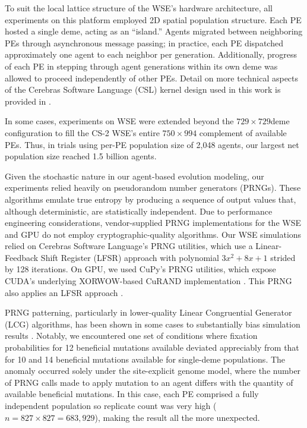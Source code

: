 To suit the local lattice structure of the WSE's hardware architecture, all experiments on this platform employed 2D spatial population structure.
Each PE hosted a single deme, acting as an ``island.''
Agents migrated between neighboring PEs through asynchronous message passing;
in practice, each PE dispatched approximately one agent to each neighbor per generation.
Additionally, progress of each PE in stepping through agent generations within its own deme was allowed to proceed independently of other PEs.
Detail on more technical aspects of the Cerebras Software Language (CSL) kernel design used in this work is provided in \citet{moreno2024trackable}.

In some cases, experiments on WSE were extended beyond the $729 \times 729$deme configuration to fill the CS-2 WSE's entire $750 \times 994$ complement of available PEs.
Thus, in trials using per-PE population size of 2,048 agents, our largest net population size reached 1.5 billion agents.

Given the stochastic nature in our agent-based evolution modeling, our experiments relied heavily on pseudorandom number generators (PRNGs).
These algorithms emulate true entropy by producing a sequence of output values that, although deterministic, are statistically independent.
Due to performance engineering considerations, vendor-supplied PRNG implementations for the WSE and GPU do not employ cryptographic-quality algorithms.
Our WSE simulations relied on Cerebras Software Language's PRNG utilities, which use a Linear-Feedback Shift Register (LFSR) approach with polynomial $3x^2 + 8x + 1$ strided by 128 iterations.
On GPU, we used CuPy's PRNG utilities, which expose CUDA's underlying XORWOW-based CuRAND implementation \citep{marsaglia2003xorshift}.
This PRNG also applies an LFSR approach \citep{brent2004note}.

PRNG patterning, particularly in lower-quality Linear Congruential Generator (LCG) algorithms, has been shown in some cases to substantially bias simulation results \citep{click2010quality}.
Notably, we encountered one set of conditions where fixation probabilities for 12 beneficial mutations available deviated appreciably from that for 10 and 14 beneficial mutations available for single-deme populations.
The anomaly occurred solely under the site-explicit genome model, where the number of PRNG calls made to apply mutation to an agent differs with the quantity of available beneficial mutations.
In this case, each PE comprised a fully independent population so replicate count was very high ($n = 827 \times 827 = 683,929$), making the result all the more unexpected.

